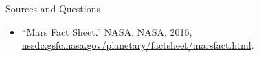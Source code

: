 \documentclass{beamer}	%
\begin{document}
\begin{frame}{Sources and Questions}

\begin{itemize}
	\item “Mars Fact Sheet.” NASA, NASA, 2016, \url{nssdc.gsfc.nasa.gov/planetary/factsheet/marsfact.html}.
\end{itemize}

\end{frame}
\end{document}
